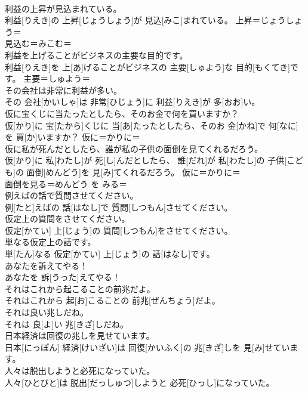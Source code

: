 \documentclass[8pt]{extreport}
\begin{document}
\begin{CJK}{UTF8}{min}
\\	利益の上昇が見込まれている。	
\\	利益[りえき]の 上昇[じょうしょう]が 見込[みこ]まれている。	上昇＝じょうしょう＝ 
\\	見込む＝みこむ＝ 
\\	利益を上げることがビジネスの主要な目的です。	
\\	利益[りえき]を 上[あ]げることがビジネスの 主要[しゅよう]な 目的[もくてき]です。	主要＝しゅよう＝ 
\\	その会社は非常に利益が多い。	
\\	その 会社[かいしゃ]は 非常[ひじょう]に 利益[りえき]が 多[おお]い。	
\\	仮に宝くじに当たったとしたら、そのお金で何を買いますか？	
\\	仮[かり]に 宝[たから]くじに 当[あ]たったとしたら、そのお 金[かね]で 何[なに]を 買[か]いますか？	仮に＝かりに＝ 
\\	仮に私が死んだとしたら、誰が私の子供の面倒を見てくれるだろう。	
\\	仮[かり]に 私[わたし]が 死[し]んだとしたら、 誰[だれ]が 私[わたし]の 子供[こども]の 面倒[めんどう]を 見[み]てくれるだろう。	仮に＝かりに＝ 
\\	面倒を見る＝めんどう を みる＝ 
\\	例えばの話で質問させてください。	
\\	例[たと]えばの 話[はなし]で 質問[しつもん]させてください。	
\\	仮定上の質問をさせてください。	
\\	仮定[かてい] 上[じょう]の 質問[しつもん]をさせてください。	
\\	単なる仮定上の話です。	
\\	単[たん]なる 仮定[かてい] 上[じょう]の 話[はなし]です。	
\\	あなたを訴えてやる！	
\\	あなたを 訴[うった]えてやる！	
\\	それはこれから起こることの前兆だよ。	
\\	それはこれから 起[お]こることの 前兆[ぜんちょう]だよ。	
\\	それは良い兆しだね。	
\\	それは 良[よ]い 兆[きざ]しだね。	
\\	日本経済は回復の兆しを見せています。	
\\	日本[にっぽん] 経済[けいざい]は 回復[かいふく]の 兆[きざ]しを 見[み]せています。	
\\	人々は脱出しようと必死になっていた。	
\\	人々[ひとびと]は 脱出[だっしゅつ]しようと 必死[ひっし]になっていた。	

\end{CJK}
\end{document}
